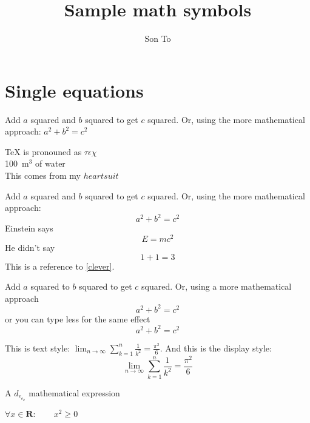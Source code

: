 \documentclass[a4paper,11pt]{report}
\author{Son To}
\title{Sample math symbols}
\begin{document}
\maketitle
\tableofcontents
\chapter{Single equations}
Add $a$ squared and $b$ squared to get $c$ squared. Or,
using the more mathematical approach:
$a^2 + b^2 = c^2$ %

\TeX{} is pronouned as $\tau\epsilon\chi$\\[5pt] %
100~m$^3$ of water\\[5pt]
This comes from my $heartsuit$

Add $a$ squared and $b$ squared to get $c$ squared. Or,
using the more mathematical approach:
\begin{equation}
  a^2 + b^2 = c^2 %
\end{equation}
Einstein says
\begin{equation}
  E = mc^2 \label{clever}
\end{equation}
He didn't say
\begin{equation}
  1 + 1 = 3 \tag{bollocks}
\end{equation}
This is a reference to \eqref{clever}.

Add $a$ squared to $b$ squared to get $c$ squared. Or, using
a more mathematical approach
\begin{equation*}
  a^2 + b^2 = c^2
\end{equation*}
or you can type less for the same effect
\[ a^2 + b^2 = c^2 \]

This is text style: $\lim_{n \to \infty}
\sum_{k=1}^n \frac{1}{k^2} = \frac{\pi^2}{6}$.
And this is the display style:
\begin{equation}
  \lim_{n \to \infty} \sum_{k=1}^n \frac{1}{k^2}
  = \frac{\pi^2}{6}
\end{equation}

A $d_{e_{e_p}}$ mathematical expression

$\forall x \in \mathbf{R}: \qquad x^2 \geq 0$
\end{document}
